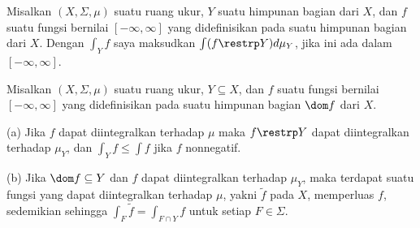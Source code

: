  Misalkan
$(X,\Sigma,\mu)$ suatu ruang ukur, $Y$ suatu himpunan bagian dari $X$,
dan $f$ suatu fungsi bernilai $[-\infty,\infty]$ yang didefinisikan pada
suatu himpunan bagian dari $X$.   Dengan $\int_Y f$ saya maksudkan
$\int(f\restrp Y)d\mu_Y$, jika ini ada dalam
$[-\infty,\infty]$.   

 Misalkan $(X,\Sigma,\mu)$ suatu ruang ukur,
$Y\subseteq X$, dan $f$ suatu fungsi bernilai $[-\infty,\infty]$ yang
didefinisikan pada suatu himpunan bagian $\dom f$ dari $X$.

(a) Jika $f$ dapat diintegralkan terhadap $\mu$ maka $f\restrp Y$ dapat diintegralkan terhadap $\mu_Y$,
dan $\int_Y f\le\int f$ jika $f$ nonnegatif.

(b) Jika $\dom f\subseteq Y$ dan $f$ dapat diintegralkan terhadap $\mu_Y$, maka terdapat
suatu fungsi yang dapat diintegralkan terhadap $\mu$, yakni $\tilde f$ pada $X$, memperluas
$f$, sedemikian sehingga $\int_F\tilde f=\int_{F\cap Y}f$ untuk setiap
$F\in\Sigma$.

